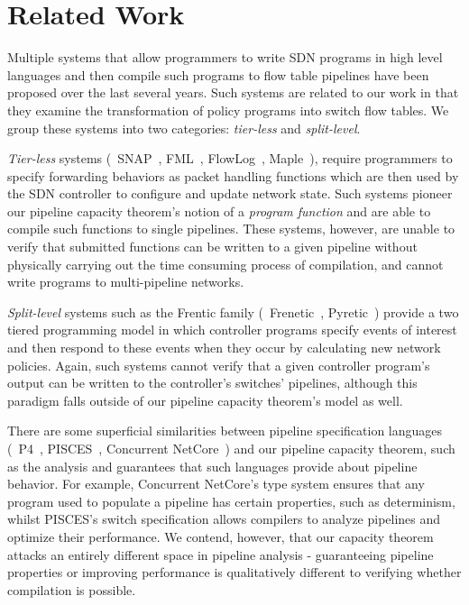 \section{Related Work}\label{sec:related-work}
 Multiple systems that allow programmers to write SDN programs in high level languages and then compile such programs to flow table pipelines have been proposed over the last several years. Such systems are related to our work in that they examine the transformation of policy programs into switch flow tables. We group these systems into two categories: \textit{tier-less} and \textit{split-level}.

\textit{Tier-less} systems (\eg\ SNAP~\cite{SNAP}, FML~\cite{fml}, FlowLog~\cite{flowlog},  Maple~\cite{maple}), require programmers to specify forwarding behaviors as packet handling functions which are then used by the SDN controller to configure and update network state. Such systems pioneer our pipeline capacity theorem's notion of a \textit{program function} and are able to compile such functions to single pipelines. These systems, however, are unable to verify that submitted functions can be written to a given pipeline without physically carrying out the time consuming process of compilation, and cannot write programs to multi-pipeline networks.

\textit{Split-level} systems such as the Frentic family (\eg\ Frenetic~\cite{frenetic}, Pyretic~\cite{pyretic}) provide a two tiered programming model in which controller programs specify events of interest and then respond to these events when they occur by calculating new network policies. Again, such systems cannot verify that a given controller program's output can be written to the controller's switches' pipelines, although this paradigm falls outside of our pipeline capacity theorem's model as well.

 There are some superficial similarities between pipeline specification languages (\eg\ P4~\cite{P4}, PISCES~\cite{PISCES}, Concurrent NetCore~\cite{ConcurrentNetCore}) and our pipeline capacity theorem, such as the analysis and guarantees that such languages provide about pipeline behavior. For example, Concurrent NetCore's type system ensures that any program used to populate a pipeline has certain properties, such as determinism, whilst PISCES's switch specification allows compilers to analyze pipelines and optimize their performance. We contend, however, that our capacity theorem attacks an entirely different space in pipeline analysis - guaranteeing pipeline properties or improving performance is qualitatively different to verifying whether compilation is possible.

